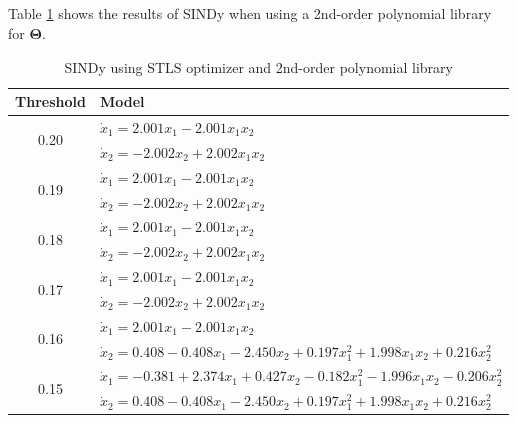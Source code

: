 \documentclass[11pt]{article}
\begin{document}
\subsection{} %

Table \ref{p1btab1} shows the results of SINDy when using a 2nd-order polynomial library for $\mathbf{\Theta}$.

\begin{table}[H]
    \centering
    \caption{SINDy using STLS optimizer and 2nd-order polynomial library}
    \label{p1btab1}
    \begin{tabular}{|c|l|}
        \hline
        Threshold & Model \\
        \hline
        \hline
        \multirow{2}{*}{0.20} & $\dot{x}_1 = 2.001 x_1 - 2.001 x_1 x_2$ \\
                              & $\dot{x}_2 = -2.002 x_2 + 2.002 x_1 x_2$ \\
        \hline
        \multirow{2}{*}{0.19} & $\dot{x}_1 = 2.001 x_1 - 2.001 x_1 x_2$ \\
                              & $\dot{x}_2 = -2.002 x_2 + 2.002 x_1 x_2$ \\
        \hline
        \multirow{2}{*}{0.18} & $\dot{x}_1 = 2.001 x_1 - 2.001 x_1 x_2$ \\
                              & $\dot{x}_2 = -2.002 x_2 + 2.002 x_1 x_2$ \\
        \hline
        \multirow{2}{*}{0.17} & $\dot{x}_1 = 2.001 x_1 - 2.001 x_1 x_2$ \\
                              & $\dot{x}_2 = -2.002 x_2 + 2.002 x_1 x_2$ \\
        \hline
        \multirow{2}{*}{0.16} & $\dot{x}_1 = 2.001 x_1 - 2.001 x_1 x_2$ \\
                              & $\dot{x}_2 = 0.408 - 0.408 x_1 - 2.450 x_2 + 0.197 x_1^2 + 1.998 x_1 x_2 + 0.216 x_2^2$ \\
        \hline
        \multirow{2}{*}{0.15} & $\dot{x}_1 = -0.381 + 2.374 x_1 + 0.427 x_2 - 0.182 x_1^2 - 1.996 x_1 x_2 - 0.206 x_2^2$ \\
                              & $\dot{x}_2 = 0.408 - 0.408 x_1 - 2.450 x_2 + 0.197 x_1^2 + 1.998 x_1 x_2 + 0.216 x_2^2$ \\
        \hline
    \end{tabular}
\end{table}


\subsection{} %
\end{document}
